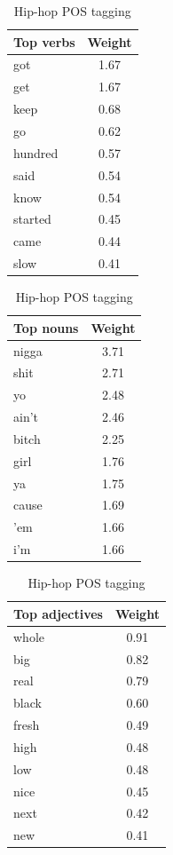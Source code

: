 \documentclass[a4paper,11pt]{article}
\begin{document}
\begin{table}[h!]
\centering
\begin{tabular}{|l|c|}
\hline
Top verbs & Weight \\
\hline
got & 1.67 \\
get & 1.67 \\
keep & 0.68 \\
go & 0.62 \\
hundred & 0.57 \\
said & 0.54 \\
know & 0.54 \\
started & 0.45 \\
came & 0.44 \\
slow & 0.41 \\
\hline
\end{tabular}
\quad
\begin{tabular}{|l|c|}
\hline
Top nouns & Weight \\
\hline
nigga & 3.71 \\
shit & 2.71 \\
yo & 2.48 \\
ain't & 2.46 \\
bitch & 2.25 \\
girl & 1.76 \\
ya & 1.75 \\
cause & 1.69 \\
'em & 1.66 \\
i'm & 1.66 \\
\hline
\end{tabular}
\quad
\begin{tabular}{|l|c|}
\hline
Top adjectives & Weight \\
\hline
whole & 0.91 \\
big & 0.82 \\
real & 0.79 \\
black & 0.60 \\
fresh & 0.49 \\
high & 0.48 \\
low & 0.48 \\
nice & 0.45 \\
next & 0.42 \\
new & 0.41 \\
\hline
\end{tabular}
\caption{Hip-hop POS tagging}
\label{label-hip-hop-pos}
\end{table}
\end{document}
